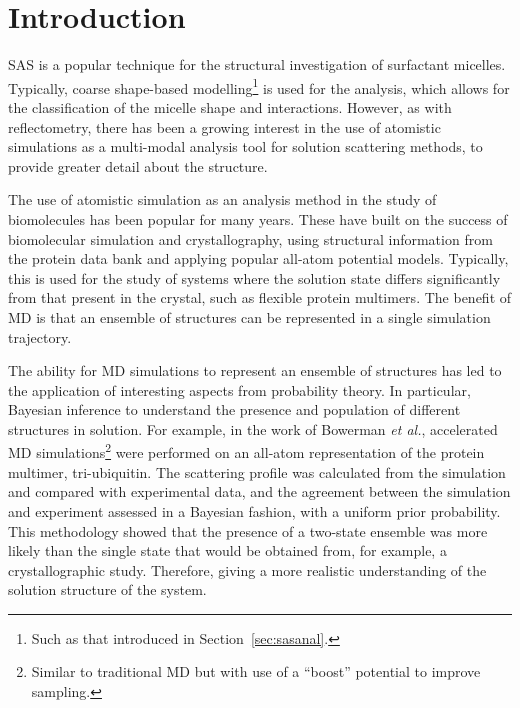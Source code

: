 \section{Introduction}
SAS is a popular technique for the structural investigation of surfactant micelles.\autocite{sanchez-fernandez_micellization_2016}
Typically, coarse shape-based modelling\footnote{Such as that introduced in Section~\ref{sec:sasanal}.} is used for the analysis, which allows for the classification of the micelle shape and interactions.
However, as with reflectometry, there has been a growing interest in the use of atomistic simulations as a multi-modal analysis tool for solution scattering methods,\autocite{ivanovic_temperature-dependent_2018} to provide greater detail about the structure.

The use of atomistic simulation as an analysis method in the study of biomolecules has been popular for many years.\autocite{perkins_solution_1991,mayans_demonstration_1995,hub_interpreting_2018}
These have built on the success of biomolecular simulation and crystallography, using structural information from the protein data bank\autocite{noauthor_rcsb_nodate} and applying popular all-atom potential models.
Typically, this is used for the study of systems where the solution state differs significantly from that present in the crystal, such as flexible protein multimers.
The benefit of MD is that an ensemble of structures can be represented in a single simulation trajectory.\autocite{chen_validating_2014,bowerman_determining_2017}

The ability for MD simulations to represent an ensemble of structures has led to the application of interesting aspects from probability theory.
In particular, Bayesian inference to understand the presence and population of different structures in solution.
For example, in the work of Bowerman \emph{et al.},\autocite{bowerman_determining_2017} accelerated MD simulations\footnote{Similar to traditional MD but with use of a ``boost'' potential to improve sampling.} were performed on an all-atom representation of the protein multimer, tri-ubiquitin.
The scattering profile was calculated from the simulation and compared with experimental data, and the agreement between the simulation and experiment assessed in a Bayesian fashion, with a uniform prior probability.
This methodology showed that the presence of a two-state ensemble was more likely than the single state that would be obtained from, for example, a crystallographic study.
Therefore, giving a more realistic understanding of the solution structure of the system.

